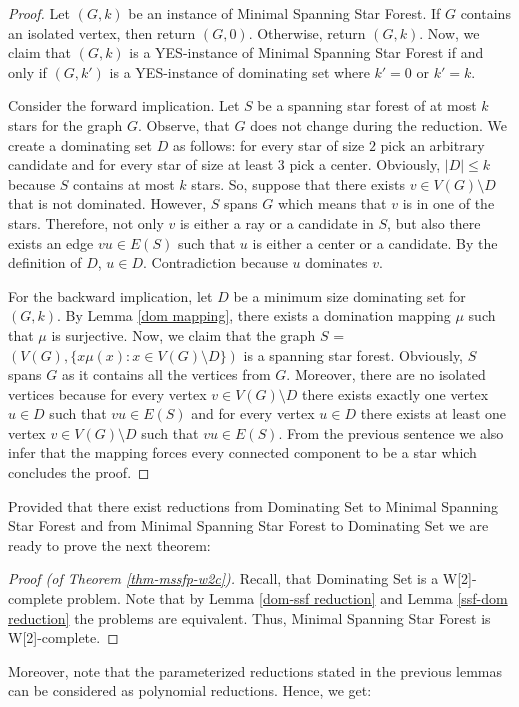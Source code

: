 \documentclass[en]{pracamgr}
\theoremstyle{definition}
\newcommand{\mssfp}{{\sc Minimal Spanning Star Forest}}
\newcommand{\domset}{dominating set}
\newcommand{\domsetp}{{\sc Dominating Set}}
\begin{document}
\begin{proof}
	Let $(G,k)$ be an instance of \mssfp{}. If $G$ contains an isolated vertex, then return $(G,0)$. Otherwise, return $(G,k)$. Now, we claim that $(G,k)$ is a YES-instance of \mssfp{} if and only if $(G,k')$ is a YES-instance of \domset{} where $k'=0$ or $k'=k$.
	
	Consider the forward implication. Let $S$ be a spanning star forest of at most $k$ stars for the graph $G$. Observe, that $G$ does not change during the reduction. We create a dominating set $D$ as follows: for every star of size $2$ pick an arbitrary candidate and for every star of size at least $3$ pick a center. Obviously, $|D| \leq k$ because $S$ contains at most $k$ stars. So, suppose that there exists $v \in V(G) \setminus D$ that is not dominated. However, $S$ spans $G$ which means that $v$ is in one of the stars. Therefore, not only $v$ is either a ray or a candidate in $S$, but also there exists an edge $vu \in E(S)$ such that $u$ is either a center or a candidate. By the definition of $D$, $u \in D$. Contradiction because $u$ dominates $v$.
	
	For the backward implication, let $D$ be a minimum size dominating set for $(G,k)$. By Lemma \ref{dom mapping}, there exists a domination mapping $\mu$ such that $\mu$ is surjective. Now, we claim that the graph $S$ = $(V(G), \{x\mu(x): x \in V(G) \setminus D\})$ is a spanning star forest. Obviously, $S$ spans $G$ as it contains all the vertices from $G$. Moreover, there are no isolated vertices because for every vertex $v \in V(G) \setminus D$ there exists exactly one vertex $u \in D$ such that $vu \in E(S)$ and for every vertex $u \in D$ there exists at least one vertex $v \in V(G) \setminus D$ such that $vu \in E(S)$. From the previous sentence we also infer that the mapping forces every connected component to be a star which concludes the proof.
\end{proof}

Provided that there exist reductions from \domsetp{} to \mssfp{} and from \mssfp{} to \domsetp{} we are ready to prove the next theorem: 

\begin{proof}[Proof (of Theorem \ref{thm-mssfp-w2c})]
	Recall, that \domsetp{} is a W[2]-complete problem. Note that by Lemma \ref{dom-ssf reduction} and Lemma \ref{ssf-dom reduction} the problems are equivalent. Thus, \mssfp{} is W[2]-complete.
\end{proof}

Moreover, note that the parameterized reductions stated in the previous lemmas can be considered as polynomial reductions. Hence, we get:
\end{document}

